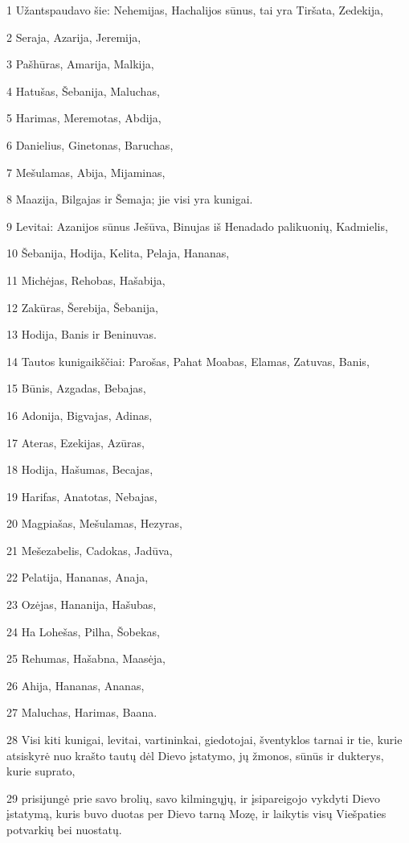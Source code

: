 \par 1 Užantspaudavo šie: Nehemijas, Hachalijos sūnus, tai yra Tiršata, Zedekija, 
\par 2 Seraja, Azarija, Jeremija, 
\par 3 Pašhūras, Amarija, Malkija, 
\par 4 Hatušas, Šebanija, Maluchas, 
\par 5 Harimas, Meremotas, Abdija, 
\par 6 Danielius, Ginetonas, Baruchas, 
\par 7 Mešulamas, Abija, Mijaminas, 
\par 8 Maazija, Bilgajas ir Šemaja; jie visi yra kunigai. 
\par 9 Levitai: Azanijos sūnus Ješūva, Binujas iš Henadado palikuonių, Kadmielis, 
\par 10 Šebanija, Hodija, Kelita, Pelaja, Hananas, 
\par 11 Michėjas, Rehobas, Hašabija, 
\par 12 Zakūras, Šerebija, Šebanija, 
\par 13 Hodija, Banis ir Beninuvas. 
\par 14 Tautos kunigaikščiai: Parošas, Pahat Moabas, Elamas, Zatuvas, Banis, 
\par 15 Būnis, Azgadas, Bebajas, 
\par 16 Adonija, Bigvajas, Adinas, 
\par 17 Ateras, Ezekijas, Azūras, 
\par 18 Hodija, Hašumas, Becajas, 
\par 19 Harifas, Anatotas, Nebajas, 
\par 20 Magpiašas, Mešulamas, Hezyras, 
\par 21 Mešezabelis, Cadokas, Jadūva, 
\par 22 Pelatija, Hananas, Anaja, 
\par 23 Ozėjas, Hananija, Hašubas, 
\par 24 Ha Lohešas, Pilha, Šobekas, 
\par 25 Rehumas, Hašabna, Maasėja, 
\par 26 Ahija, Hananas, Ananas, 
\par 27 Maluchas, Harimas, Baana. 
\par 28 Visi kiti kunigai, levitai, vartininkai, giedotojai, šventyklos tarnai ir tie, kurie atsiskyrė nuo krašto tautų dėl Dievo įstatymo, jų žmonos, sūnūs ir dukterys, kurie suprato, 
\par 29 prisijungė prie savo brolių, savo kilmingųjų, ir įsipareigojo vykdyti Dievo įstatymą, kuris buvo duotas per Dievo tarną Mozę, ir laikytis visų Viešpaties potvarkių bei nuostatų. 
